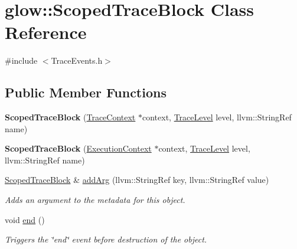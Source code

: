 \hypertarget{classglow_1_1_scoped_trace_block}{}\section{glow\+:\+:Scoped\+Trace\+Block Class Reference}
\label{classglow_1_1_scoped_trace_block}


{\ttfamily \#include $<$Trace\+Events.\+h$>$}

\subsection*{Public Member Functions}
\begin{DoxyCompactItemize}
\item 
\mbox{\label{classglow_1_1_scoped_trace_block_aab70a32f631354f1e9500282632c7c13}} 
{\bfseries Scoped\+Trace\+Block} (\hyperlink{classglow_1_1_trace_context}{Trace\+Context} $\ast$context, \hyperlink{structglow_1_1_trace_event_a10132a384d74408a112510cbe1b7d978}{Trace\+Level} level, llvm\+::\+String\+Ref name)
\item 
\mbox{\label{classglow_1_1_scoped_trace_block_af39210ef4c490db6c377cdc259630b40}} 
{\bfseries Scoped\+Trace\+Block} (\hyperlink{classglow_1_1_execution_context}{Execution\+Context} $\ast$context, \hyperlink{structglow_1_1_trace_event_a10132a384d74408a112510cbe1b7d978}{Trace\+Level} level, llvm\+::\+String\+Ref name)
\item 
\mbox{\label{classglow_1_1_scoped_trace_block_ae79d5f2a28d0526a5a686f4d8f0117f5}} 
\hyperlink{classglow_1_1_scoped_trace_block}{Scoped\+Trace\+Block} \& \hyperlink{classglow_1_1_scoped_trace_block_ae79d5f2a28d0526a5a686f4d8f0117f5}{add\+Arg} (llvm\+::\+String\+Ref key, llvm\+::\+String\+Ref value)
\begin{DoxyCompactList}\small\item\em Adds an argument to the metadata for this object. \end{DoxyCompactList}\item 
void \hyperlink{classglow_1_1_scoped_trace_block_a8bd958641c7a2118a0e96343514e7b39}{end} ()
\begin{DoxyCompactList}\small\item\em Triggers the \char`\"{}end\char`\"{} event before destruction of the object. \end{DoxyCompactList}\end{DoxyCompactItemize}


